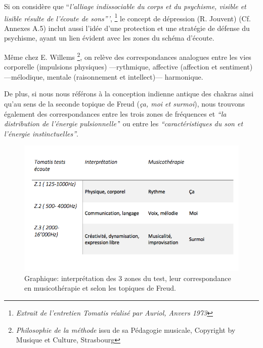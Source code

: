 Si on considère que ``\emph{l'alliage indissociable du corps et du psychisme, 
visible et lisible résulte de l'écoute de
sons'''}, \footnote{\emph{Extrait de l'entretien Tomatis réalisé par
  Auriol, Anvers 1973}} le concept de dépression (R. Jouvent) \autocite{doronparot} (Cf. Annexes
A.5) inclut aussi l'idée d'une protection et une stratégie de
défense du psychisme, ayant un lien évident avec les zones du schéma d'écoute.

Même chez E. Willems \autocite{willems} \footnote{\textit{Philosophie de la méthode} issu de sa
Pédagogie musicale, Copyright by Musique et Culture, Strasbourg}, on relève des correspondances analogues entre les vies
corporelle (impulsions physiques)
---rythmique, affective (affection et sentiment) ---mélodique, mentale
(raisonnement et intellect)--- harmonique.


De plus, si nous nous référons à la conception indienne antique des chakras
ainsi qu'au sens de la seconde
topique de Freud (\textit{ça, moi et surmoi}), nous trouvons également des correspondances
entre les trois zones de 
fréquences et \textit{``la distribution de l'énergie pulsionnelle'}' ou entre
les 
\textit{``caractéristiques du son et l'énergie
instinctuelles''}\autocite[ch. 13]{auriol_cle_1996}.

\begin{figure}
	\centering
	\includegraphics[width=0.7\linewidth]{images/testinterpmusico}
	\caption[ L'interprétation des 3 zones et leur correspondance
        en musicothérapie]{Graphique: interprétation des 3 zones du
          test, leur correspondance en musicothérapie et selon les
          topiques de Freud.}
       
	\label{graphiquecolonnetestmusico}
      \end{figure}






